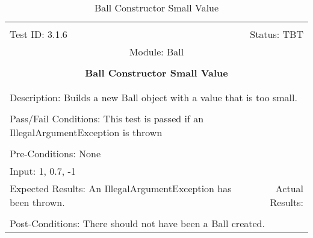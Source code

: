 \documentclass[titlepage]{article}
\begin{document}
\begin{center}%
\begin{table}[h!]
\begin{tabular}{|l r|}\hline&\\[-2mm]
	Test ID: 3.1.6	&Status: TBT\\[-3mm]
	\multicolumn{2}{|c|}{Module: Ball}\\&\\
	\multicolumn{2}{|c|}{\textbf{\large{Ball Constructor Small Value}}}\\&\\\hline&\\[-3mm]
	\multicolumn{2}{|p{\textwidth}|}{Description: Builds a new Ball object with a value that is too small.}\\[1mm]\hline&\\[-3mm]
	\multicolumn{2}{|p{\textwidth}|}{Pass/Fail Conditions: This test is passed if an IllegalArgumentException is thrown}\\[1mm]\hline&\\[-3mm]
	\multicolumn{2}{|p{\textwidth}|}{Pre-Conditions: None}\\[4mm]
	\multicolumn{2}{|p{\textwidth}|}{Input: 1, 0.7, -1}\\[2mm]\hline
	\multicolumn{1}{|p{0.49\textwidth}}{Expected Results: An IllegalArgumentException has been thrown.}	&\multicolumn{1}{|p{0.45\textwidth}|}{Actual Results:}\\\hline&\\[-3mm]
	\multicolumn{2}{|p{\textwidth}|}{Post-Conditions: There should not have been a Ball created.}\\\hline
\end{tabular}
\caption{Ball Constructor Small Value}
\end{table}
\end{center}
\end{document}
